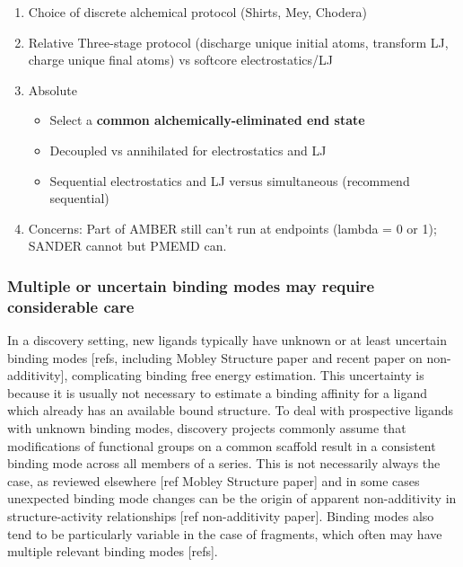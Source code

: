 \documentclass[9pt,bestpractices]{livecoms}
\begin{document}
\begin{enumerate}
\item Choice of discrete alchemical protocol (Shirts, Mey, Chodera)
\item Relative
Three-stage protocol (discharge unique initial atoms, transform LJ, charge unique final atoms) vs softcore electrostatics/LJ

\item Absolute
	\begin{itemize}
	\item Select a \textbf{common alchemically-eliminated end state}
	\item Decoupled vs annihilated for electrostatics and LJ
	\item Sequential electrostatics and LJ versus simultaneous (recommend sequential)

\end{itemize}
\item Concerns:
Part of AMBER still can’t run at endpoints (lambda = 0 or 1); SANDER cannot but PMEMD can.

\end{enumerate}


\subsubsection{Multiple or uncertain binding modes may require considerable care}
\label{sec:multiple_binding_modes}

In a discovery setting, new ligands typically have unknown or at least uncertain binding modes [refs, including Mobley Structure paper and recent paper on non-additivity], complicating binding free energy estimation.
This uncertainty is because it is usually not necessary to estimate a binding affinity for a ligand which already has an available bound structure.
To deal with prospective ligands with unknown binding modes, discovery projects commonly assume that modifications of functional groups on a common scaffold result in a consistent binding mode across all members of a series.
This is not necessarily always the case, as reviewed elsewhere [ref Mobley Structure paper] and in some cases unexpected binding mode changes can be the origin of apparent non-additivity in structure-activity relationships [ref non-additivity paper].
Binding modes also tend to be particularly variable in the case of fragments, which often may have multiple relevant binding modes [refs].
\end{document}
